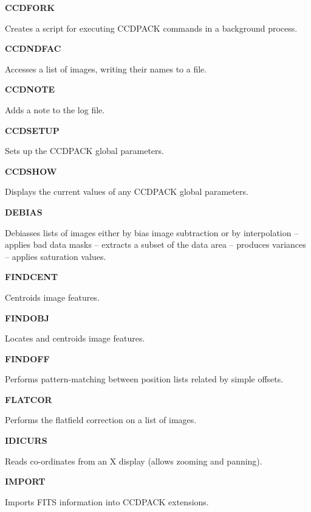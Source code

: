 \documentclass[twoside,11pt]{article}
\newenvironment{latexonly}{}{}
\renewcommand{\_}{\texttt{\symbol{95}}}
\newcommand{\quickdes}[3]{
                         \parbox{1.1in}{\bf #1}
                         \parbox{4.4in}{\raggedright #2 \dotfill}
                         \parbox{0.6in}{\pageref{#3}}
                         \vspace*{0.2in}}
\begin{document}
\begin{latexonly}
\quickdes{CCDFORK}{Creates a script for executing CCDPACK
                   commands in a background process.}{CCDFORK}

\quickdes{CCDNDFAC}{Accesses a list of images, writing their names to a file.}
         {CCDNDFAC}

\quickdes{CCDNOTE}{Adds a note to the log file.}{CCDNOTE}

\quickdes{CCDSETUP}{Sets up the CCDPACK global parameters.}{CCDSETUP}

\quickdes{CCDSHOW}{Displays the current values of any CCDPACK global
                   parameters.}{CCDSHOW}

\quickdes{DEBIAS}{Debiasses lists of images either by bias image
                 subtraction or by interpolation --
                 applies bad data masks --
                 extracts a subset of the data area --
                 produces variances --
                 applies saturation values.}
                 {DEBIAS}

\quickdes{FINDCENT}{Centroids image features.}
                   {FINDCENT}

\quickdes{FINDOBJ}{Locates and centroids image features.}
                  {FINDOBJ}

\quickdes{FINDOFF}{Performs pattern-matching between position lists
                   related by simple offsets.}
                   {FINDOFF}

\quickdes{FLATCOR}{Performs the flatfield correction on a list of images.}
                  {FLATCOR}

\quickdes{IDICURS}{Reads co-ordinates from an X display (allows
                   zooming and panning).}{IDICURS}

\quickdes{IMPORT}{Imports FITS information into CCDPACK extensions.}{IMPORT}

\end{latexonly}
\end{document}
